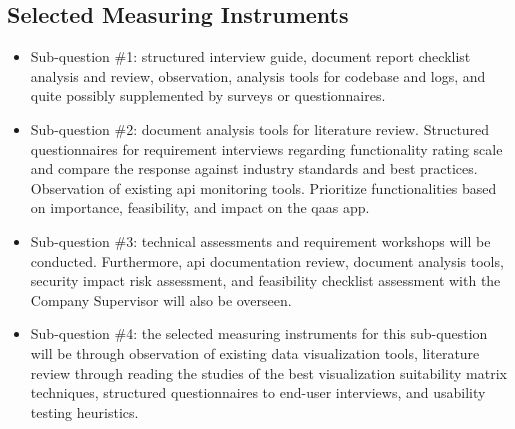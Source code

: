 \begin{multicols}{2}
\begin{itemize}[label=-]
                  \subsection{Selected Measuring Instruments}
      \end{itemize}
      \begin{itemize}[label=-]
            \item Sub-question \#1: structured interview guide, document report checklist analysis and review,
                  observation, analysis tools for codebase and logs, and quite possibly supplemented by surveys
                  or questionnaires.
            \item Sub-question \#2: document analysis tools for literature review. Structured questionnaires for
                  requirement interviews regarding functionality rating scale and compare the response against
                  industry standards and best practices. Observation of existing \acrshort{api} monitoring tools.
                  Prioritize functionalities based on importance, feasibility, and impact on the \acrshort{qaas} app.
            \item Sub-question \#3: technical assessments and requirement workshops will be conducted. Furthermore,
                  \acrshort{api} documentation  review, document analysis tools, security impact risk assessment,
                  and feasibility checklist assessment with the Company Supervisor will also be overseen.
            \item Sub-question \#4: the selected measuring instruments for this sub-question will be through
                  observation of existing data visualization tools, literature review through reading the studies of
                  the best visualization suitability matrix techniques, structured questionnaires to end-user
                  interviews, and usability testing heuristics.
      \end{itemize}

\end{multicols}
